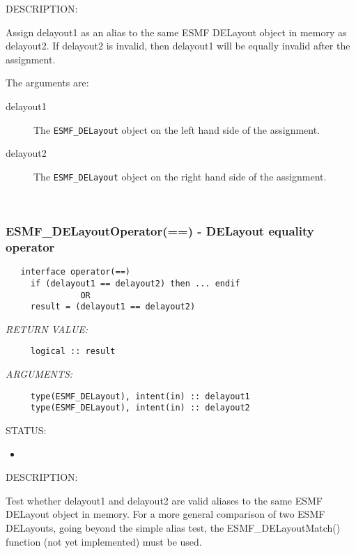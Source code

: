 {\sf DESCRIPTION:\\ }


     Assign delayout1 as an alias to the same ESMF DELayout object in memory
     as delayout2. If delayout2 is invalid, then delayout1 will be equally
     invalid after the assignment.
  
     The arguments are:
     \begin{description}
     \item[delayout1]
       The {\tt ESMF\_DELayout} object on the left hand side of the assignment.
     \item[delayout2]
       The {\tt ESMF\_DELayout} object on the right hand side of the assignment.
     \end{description}
   
 
\mbox{}\hrulefill\ 
 
\subsubsection [ESMF\_DELayoutOperator(==)] {ESMF\_DELayoutOperator(==) - DELayout equality operator}


  
\begin{verbatim}   interface operator(==)
     if (delayout1 == delayout2) then ... endif
               OR
     result = (delayout1 == delayout2)\end{verbatim}{\em RETURN VALUE:}
\begin{verbatim}     logical :: result\end{verbatim}{\em ARGUMENTS:}
\begin{verbatim}     type(ESMF_DELayout), intent(in) :: delayout1
     type(ESMF_DELayout), intent(in) :: delayout2\end{verbatim}
{\sf STATUS:}
   \begin{itemize}
   \item{}
   \end{itemize}
  
{\sf DESCRIPTION:\\ }


     Test whether delayout1 and delayout2 are valid aliases to the same ESMF
     DELayout object in memory. For a more general comparison of two
     ESMF DELayouts, going beyond the simple alias test, the 
     ESMF\_DELayoutMatch() function (not yet implemented) must
     be used.
  
